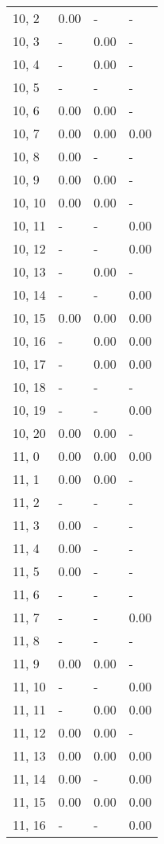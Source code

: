 \begin{table}
\begin{tabular}{llll}
10, 2  &  0.00 &     - &     - \\
10, 3  &     - &  0.00 &     - \\
10, 4  &     - &  0.00 &     - \\
10, 5  &     - &     - &     - \\
10, 6  &  0.00 &  0.00 &     - \\
10, 7  &  0.00 &  0.00 &  0.00 \\
10, 8  &  0.00 &     - &     - \\
10, 9  &  0.00 &  0.00 &     - \\
10, 10 &  0.00 &  0.00 &     - \\
10, 11 &     - &     - &  0.00 \\
10, 12 &     - &     - &  0.00 \\
10, 13 &     - &  0.00 &     - \\
10, 14 &     - &     - &  0.00 \\
10, 15 &  0.00 &  0.00 &  0.00 \\
10, 16 &     - &  0.00 &  0.00 \\
10, 17 &     - &  0.00 &  0.00 \\
10, 18 &     - &     - &     - \\
10, 19 &     - &     - &  0.00 \\
10, 20 &  0.00 &  0.00 &     - \\
11, 0  &  0.00 &  0.00 &  0.00 \\
11, 1  &  0.00 &  0.00 &     - \\
11, 2  &     - &     - &     - \\
11, 3  &  0.00 &     - &     - \\
11, 4  &  0.00 &     - &     - \\
11, 5  &  0.00 &     - &     - \\
11, 6  &     - &     - &     - \\
11, 7  &     - &     - &  0.00 \\
11, 8  &     - &     - &     - \\
11, 9  &  0.00 &  0.00 &     - \\
11, 10 &     - &     - &  0.00 \\
11, 11 &     - &  0.00 &  0.00 \\
11, 12 &  0.00 &  0.00 &     - \\
11, 13 &  0.00 &  0.00 &  0.00 \\
11, 14 &  0.00 &     - &  0.00 \\
11, 15 &  0.00 &  0.00 &  0.00 \\
11, 16 &     - &     - &  0.00 \\

\end{tabular}
\end{table}
